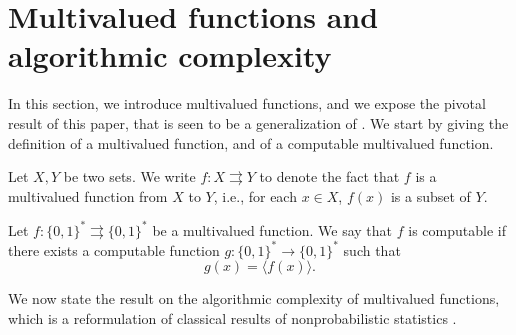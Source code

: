 
\section{Multivalued functions and algorithmic complexity}

\label{sec:multivalued functions and algorithmic complexity}

In this section, we introduce multivalued functions, and we expose the pivotal result of this paper, that is seen to be a generalization of \cite[Theorem 2]{staiger2002kolmogorov}. We start by giving the definition of a multivalued function, and of a computable multivalued function.

\begin{definition}\label{def:multivalued_function}
    Let $X,Y$ be two sets. We write $f: X \rightrightarrows Y$ to denote the fact that $f$ is a multivalued function from $X$ to $Y$, i.e., for each $x \in X$, $f(x)$ is a subset of $Y$.
\end{definition}

\begin{definition}\label{def:computable_multivalued_function}
    Let $f: \{0,1\}^\ast \rightrightarrows \{0,1\}^\ast$ be a multivalued function. We say that $f$ is computable if there exists a computable function $g : \{0,1\}^\ast \to \{0,1\}^\ast$ such that 
    \begin{equation}
        g(x) = \langle  f(x) \rangle. 
    \end{equation}
\end{definition}

We now state the result on the algorithmic complexity of multivalued functions, which is a reformulation of classical results of nonprobabilistic statistics \cite[Section 5.5]{li2008introduction}.


